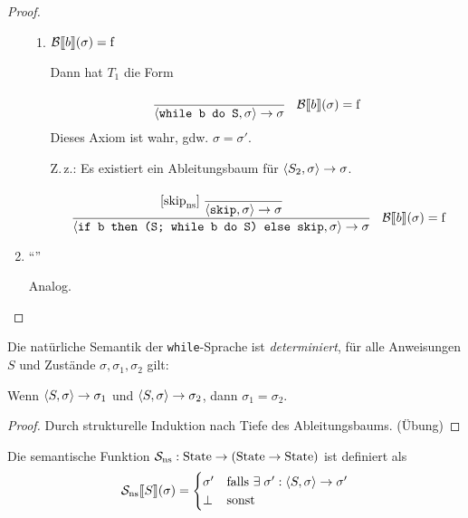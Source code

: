 \begin{proof}
\begin{enumerate}
\begin{enumerate}
                \item $\mathcal{B}\mathrm{[}\kern-.14em\mathrm{[} b\mathrm{]}\kern-.14em\mathrm{]}(\sigma) = \operatorname{f}$

                    Dann hat $T_1$ die Form
                    \begin{align*}
                        [\text{while}_{\text{ns}}^{\false}]
                        \cfrac{}{
                            \strans{\texttt{while b do S}}{\sigma}{\sigma}
                        }
                        \quad
                        \Bsem{b}(\sigma) = \false
                    \end{align*}
                    Dieses Axiom ist wahr, gdw. $\sigma = \sigma'$.

                    Z.\,z.: Es existiert ein Ableitungsbaum für $\langle S_2, \sigma \rangle \to \sigma$.
                    \begin{align*}
                        [\text{if}_{\text{ns}}^{\false}]\;
                        \cfrac{
                            [\text{skip}_{\text{ns}}]\;
                            \cfrac{}{\strans{\texttt{skip}}{\sigma}{\sigma}}
                        }{
                            \strans{\texttt{if b then (S; while b do S) else skip}}{\sigma}{\sigma}
                        }
                        \quad
                        \Bsem{b}(\sigma) = \false
                    \end{align*}
            \end{enumerate}

        \item ``\Leftarrow''

            Analog.
    \end{enumerate}
\end{proof}

\begin{remark}
    Die natürliche Semantik der \texttt{while}-Sprache ist \emph{determiniert}, \dh für alle Anweisungen $S$ und Zustände $\sigma, \sigma_1, \sigma_2$ gilt:

    Wenn $\langle S, \sigma \rangle \to \sigma_1$ und $\langle S, \sigma \rangle \to \sigma_2$, dann $\sigma_1 = \sigma_2$.
\end{remark}
\begin{proof}
    Durch strukturelle Induktion nach Tiefe des Ableitungsbaums. (Übung)
\end{proof}


\begin{definition}
    Die semantische Funktion $\mathcal{S}_{\text{ns}}: \operatorname{State} \to (\operatorname{State} \to \operatorname{State})$ ist definiert als
    \begin{align*}
        \mathcal{S}_{\text{ns}}\mathrm{[}\kern-.14em\mathrm{[} S \mathrm{]}\kern-.14em\mathrm{]}(\sigma) = \begin{cases}
            \sigma' & \text{falls } \exists\; \sigma': \langle S, \sigma \rangle \to \sigma' \\
            \bot & \text{sonst}
        \end{cases}
    \end{align*}
\end{definition}